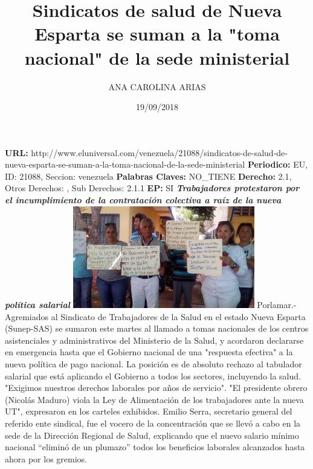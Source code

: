 \documentclass{article}%
\title{\textbf{Sindicatos de salud de Nueva Esparta se suman a la "toma nacional" de la sede ministerial}}%
\author{ANA CAROLINA ARIAS}%
\date{19/09/2018}%
\begin{document}
%
\normalsize%
\maketitle%
\textbf{URL: }%
http://www.eluniversal.com/venezuela/21088/sindicatos{-}de{-}salud{-}de{-}nueva{-}esparta{-}se{-}suman{-}a{-}la{-}toma{-}nacional{-}de{-}la{-}sede{-}ministerial\newline%
%
\textbf{Periodico: }%
EU, %
ID: %
21088, %
Seccion: %
venezuela\newline%
%
\textbf{Palabras Claves: }%
NO\_TIENE\newline%
%
\textbf{Derecho: }%
2.1, %
Otros Derechos: %
, %
Sub Derechos: %
2.1.1\newline%
%
\textbf{EP: }%
SI\newline%
\newline%
%
\textbf{\textit{Trabajadores protestaron por el incumplimiento de la contratación colectiva a raíz de la nueva política salarial}}%
\newline%
\newline%
%
\includegraphics[width=300px]{81.jpg}%
\newline%
%
Porlamar.{-} Agremiados al Sindicato de Trabajadores de la Salud en el estado Nueva Esparta (Sunep{-}SAS) se sumaron este martes al llamado a tomas nacionales de los centros asistenciales y administrativos del Ministerio de la Salud, y acordaron declararse en emergencia hasta que el Gobierno nacional de una "respuesta efectiva" a la nueva política de pago nacional.%
\newline%
%
La posición es de absoluto rechazo al tabulador salarial que está aplicando el Gobierno a todos los sectores, incluyendo la salud. "Exigimos nuestros derechos laborales por años de servicio". "El presidente obrero (Nicolás Maduro) viola la Ley de Alimentación  de los trabajadores  ante la nueva UT", expresaron en los carteles exhibidos.%
\newline%
%
Emilio Serra, secretario general del referido ente sindical, fue el vocero de la concentración que se llevó a cabo en la sede de la Dirección Regional de Salud, explicando que el nuevo salario mínimo nacional “eliminó de un plumazo” todos los beneficios laborales alcanzados hasta ahora por los gremios.%
\end{document}
